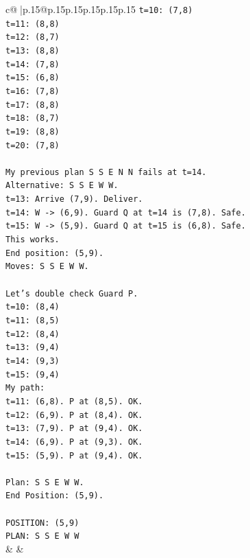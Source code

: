 \documentclass{article}
\begin{document}
{\begin{supertabular}{c@{$\;$}|p{.15\linewidth}@{}p{.15\linewidth}p{.15\linewidth}p{.15\linewidth}p{.15\linewidth}p{.15\linewidth}}
{{{\texttt{t=10: (7,8)} \\
\texttt{t=11: (8,8)} \\
\texttt{t=12: (8,7)} \\
\texttt{t=13: (8,8)} \\
\texttt{t=14: (7,8)} \\
\texttt{t=15: (6,8)} \\
\texttt{t=16: (7,8)} \\
\texttt{t=17: (8,8)} \\
\texttt{t=18: (8,7)} \\
\texttt{t=19: (8,8)} \\
\texttt{t=20: (7,8)} \\
\\ 
\texttt{My previous plan S S E N N fails at t=14.} \\
\texttt{Alternative: S S E W W.} \\
\texttt{t=13: Arrive (7,9). Deliver.} \\
\texttt{t=14: W {-}> (6,9). Guard Q at t=14 is (7,8). Safe.} \\
\texttt{t=15: W {-}> (5,9). Guard Q at t=15 is (6,8). Safe.} \\
\texttt{This works.} \\
\texttt{End position: (5,9).} \\
\texttt{Moves: S S E W W.} \\
\\ 
\texttt{Let's double check Guard P.} \\
\texttt{t=10: (8,4)} \\
\texttt{t=11: (8,5)} \\
\texttt{t=12: (8,4)} \\
\texttt{t=13: (9,4)} \\
\texttt{t=14: (9,3)} \\
\texttt{t=15: (9,4)} \\
\texttt{My path:} \\
\texttt{t=11: (6,8). P at (8,5). OK.} \\
\texttt{t=12: (6,9). P at (8,4). OK.} \\
\texttt{t=13: (7,9). P at (9,4). OK.} \\
\texttt{t=14: (6,9). P at (9,3). OK.} \\
\texttt{t=15: (5,9). P at (9,4). OK.} \\
\\ 
\texttt{Plan: S S E W W.} \\
\texttt{End Position: (5,9).} \\
\\ 
\texttt{POSITION: (5,9)} \\
\texttt{PLAN: S S E W W} \\
            }
        }
    }
    & & \\ \\


\end{supertabular}}
\end{document}
